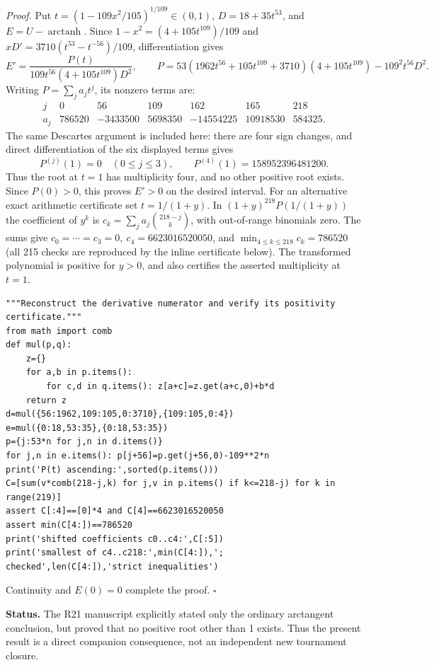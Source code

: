\documentclass[11pt,a4paper]{article}
\numberwithin{equation}{section}
\theoremstyle{definition}
\theoremstyle{remark}
\begin{document}
\textit{Proof.} Put \(t=(1-109x^2/105)^{1/109}\in(0,1)\),
\(D=18+35t^{53}\), and \(E=U-\operatorname{arctanh}\).
Since \(1-x^2=(4+105t^{109})/109\) and
\(xD'=3710(t^{53}-t^{-56})/109\), differentiation gives
\[
 E'=\frac{P(t)}{109t^{56}(4+105t^{109})D^2},\qquad
 P=53(1962t^{56}+105t^{109}+3710)(4+105t^{109})-109^2t^{56}D^2 .
\]
Writing \(P=\sum_j a_jt^j\), its nonzero terms are:
\[
\begin{array}{c|rrrrrr}
j&0&56&109&162&165&218\\\hline
a_j &786520&-3433500&5698350&-14554225&10918530&584325 .
\end{array}
\]
The same Descartes argument is included here: there are four sign changes,
and direct differentiation of the six displayed terms gives
\[
 P^{(j)}(1)=0\quad(0\le j\le3),\qquad
 P^{(4)}(1)=158952396481200.
\]
Thus the root at \(t=1\) has multiplicity four, and no other positive
root exists. Since \(P(0)>0\), this proves \(E'>0\) on the desired interval.
For an alternative exact arithmetic certificate set \(t=1/(1+y)\). In
\((1+y)^{218}P(1/(1+y))\) the coefficient of \(y^k\) is
\(c_k=\sum_j a_j\binom{218-j}{k}\), with out-of-range binomials zero.
The sums give \(c_0=\cdots=c_3=0,\ c_4=6623016520050\), and
\(\min_{4\le k\le218}c_k=786520\) (all 215 checks are reproduced by the
inline certificate below). The transformed polynomial is positive for \(y>0\),
and also certifies the asserted multiplicity at \(t=1\).
\begin{Verbatim}
"""Reconstruct the derivative numerator and verify its positivity certificate."""
from math import comb
def mul(p,q):
    z={}
    for a,b in p.items():
        for c,d in q.items(): z[a+c]=z.get(a+c,0)+b*d
    return z
d=mul({56:1962,109:105,0:3710},{109:105,0:4})
e=mul({0:18,53:35},{0:18,53:35})
p={j:53*n for j,n in d.items()}
for j,n in e.items(): p[j+56]=p.get(j+56,0)-109**2*n
print('P(t) ascending:',sorted(p.items()))
C=[sum(v*comb(218-j,k) for j,v in p.items() if k<=218-j) for k in range(219)]
assert C[:4]==[0]*4 and C[4]==6623016520050
assert min(C[4:])==786520
print('shifted coefficients c0..c4:',C[:5])
print('smallest of c4..c218:',min(C[4:]),'; checked',len(C[4:]),'strict inequalities')
\end{Verbatim}


Continuity and \(E(0)=0\) complete the proof. \hfill\(\square\)

\textbf{Status.} The R21 manuscript explicitly stated only the ordinary
arctangent conclusion, but proved that no positive root other than 1
exists. Thus the present result is a direct companion consequence, not
an independent new tournament closure.
\end{document}
